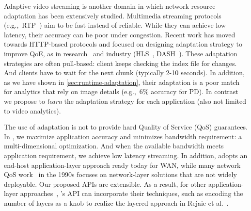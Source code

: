 \documentclass[thesis.tex]{subfiles}
\begin{document}
Adaptive video streaming is another domain in which network resource adaptation
has been extensively studied. Multimedia streaming protocols
(e.g.,~RTP~\cite{schulzrinne2006rtp}) aim to be fast instead of reliable. While
they can achieve low latency, their accuracy can be poor under congestion.
Recent work has moved towards HTTP-based protocols and focused on designing
adaptation strategy to improve QoE, as in research~\cite{mao2017neural,
  sun2016cs2p, yin2015control} and industry (HLS~\cite{pantos2016http},
DASH~\cite{michalos2012dynamic, sodagar2011mpeg}). These adaptation strategies
are often pull-based: client keeps checking the index file for changes. And
clients have to wait for the next chunk (typically 2-10 seconds). In addition,
as we have shown in \autoref{sec:runtime-adaptation}, their adaptation is a poor
match for analytics that rely on image details (e.g.,~6\% accuracy for PD). In
contrast we propose to \emph{learn} the adaptation strategy for each application
(also not limited to video analytics).

The use of adaptation is not to provide hard Quality of Service (QoS)
guarantees. In \awstream{}, we maximize application accuracy and minimizes
bandwidth requirement: a multi-dimensional optimization. And when the available
bandwidth meets application requirement, we achieve low latency streaming.  In
addition, \awstream{} adopts an end-host application-layer approach ready today
for WAN, while many network QoS work~\cite{ferrari1990scheme,
  shenker1994integrated, shenker1995fundamental} in the 1990s focuses on
network-layer solutions that are not widely deployable. Our proposed APIs are
extensible. As a result, for other application-layer
approaches~\cite{vandalore2001survey}, \awstream{}'s API can incorporate their
techniques, such as encoding the number of layers as a knob to realize the
layered approach in Rejaie et al.~\cite{rejaie2000layered}.


\end{document}
